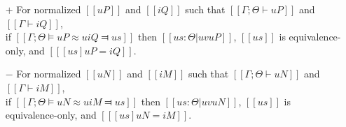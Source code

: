 \begin{lemma} \label{lemma:unification-soundness}
    \hfill
    \begin{itemize}
        \item [$+$] For normalized $[[uP]]$ and $[[iQ]]$ such that 
        $[[Γ ; Θ ⊢ uP]]$ and $[[Γ ⊢ iQ]]$,\\ 
        if $[[Γ ; Θ ⊨ uP ≈u iQ ⫤ us]]$ then $[[us : Θ | uv uP]]$, 
        $[[us]]$ is equivalence-only, and $[[ [us]uP = iQ ]]$.

        \item [$-$] For normalized $[[uN]]$ and $[[iM]]$ such that
        $[[Γ ; Θ ⊢ uN]]$ and $[[Γ ⊢ iM]]$,\\
        if $[[Γ ; Θ ⊨ uN ≈u iM ⫤ us]]$ then $[[us : Θ | uv uN]]$,
        $[[us]]$ is equivalence-only, and $[[ [us]uN = iM ]]$.
    \end{itemize}
\end{lemma}
